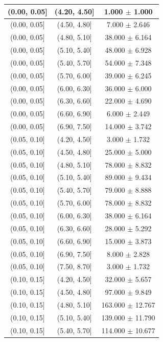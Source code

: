 \begin{longtable}{|c|c|c|}
\hline
\endlastfoot
(0.00, 0.05] & (4.20, 4.50] & 1.000 $\pm$ 1.000 \\ 
\hline
(0.00, 0.05] & (4.50, 4.80] & 7.000 $\pm$ 2.646 \\ 
\hline
(0.00, 0.05] & (4.80, 5.10] & 38.000 $\pm$ 6.164 \\ 
\hline
(0.00, 0.05] & (5.10, 5.40] & 48.000 $\pm$ 6.928 \\ 
\hline
(0.00, 0.05] & (5.40, 5.70] & 54.000 $\pm$ 7.348 \\ 
\hline
(0.00, 0.05] & (5.70, 6.00] & 39.000 $\pm$ 6.245 \\ 
\hline
(0.00, 0.05] & (6.00, 6.30] & 36.000 $\pm$ 6.000 \\ 
\hline
(0.00, 0.05] & (6.30, 6.60] & 22.000 $\pm$ 4.690 \\ 
\hline
(0.00, 0.05] & (6.60, 6.90] & 6.000 $\pm$ 2.449 \\ 
\hline
(0.00, 0.05] & (6.90, 7.50] & 14.000 $\pm$ 3.742 \\ 
\hline
(0.05, 0.10] & (4.20, 4.50] & 3.000 $\pm$ 1.732 \\ 
\hline
(0.05, 0.10] & (4.50, 4.80] & 25.000 $\pm$ 5.000 \\ 
\hline
(0.05, 0.10] & (4.80, 5.10] & 78.000 $\pm$ 8.832 \\ 
\hline
(0.05, 0.10] & (5.10, 5.40] & 89.000 $\pm$ 9.434 \\ 
\hline
(0.05, 0.10] & (5.40, 5.70] & 79.000 $\pm$ 8.888 \\ 
\hline
(0.05, 0.10] & (5.70, 6.00] & 78.000 $\pm$ 8.832 \\ 
\hline
(0.05, 0.10] & (6.00, 6.30] & 38.000 $\pm$ 6.164 \\ 
\hline
(0.05, 0.10] & (6.30, 6.60] & 28.000 $\pm$ 5.292 \\ 
\hline
(0.05, 0.10] & (6.60, 6.90] & 15.000 $\pm$ 3.873 \\ 
\hline
(0.05, 0.10] & (6.90, 7.50] & 8.000 $\pm$ 2.828 \\ 
\hline
(0.05, 0.10] & (7.50, 8.70] & 3.000 $\pm$ 1.732 \\ 
\hline
(0.10, 0.15] & (4.20, 4.50] & 32.000 $\pm$ 5.657 \\ 
\hline
(0.10, 0.15] & (4.50, 4.80] & 97.000 $\pm$ 9.849 \\ 
\hline
(0.10, 0.15] & (4.80, 5.10] & 163.000 $\pm$ 12.767 \\ 
\hline
(0.10, 0.15] & (5.10, 5.40] & 139.000 $\pm$ 11.790 \\ 
\hline
(0.10, 0.15] & (5.40, 5.70] & 114.000 $\pm$ 10.677 \\ 

\end{longtable}
